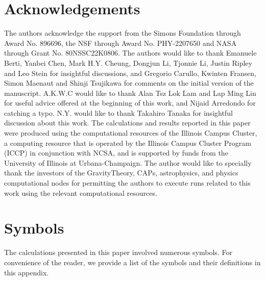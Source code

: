 \documentclass[aps,prx,amsmath,floats,floatfix,twocolumn,
  superscriptaddress,nofootinbib,showpacs]{revtex4-1}
\begin{document}
\section*{Acknowledgements}

The authors acknowledge the support from the Simons Foundation through Award No. 896696, the NSF through Award No. PHY-2207650 and NASA through Grant No. 80NSSC22K0806. 
The authors would like to thank Emanuele Berti, Yanbei Chen, Mark H.Y. Cheung, Dongjun Li, Tjonnie Li, Justin Ripley and Leo Stein for insightful discussions, and Gregorio Carullo, Kwinten Fransen, Simon Maenaut and Shinji Tsujikawa for comments on the initial version of the manuscript.
A.K.W.C would like to thank Alan Tsz Lok Lam and Lap Ming Lin for useful advice offered at the beginning of this work, and Nijaid Arredondo for catching a typo. 
N.Y. would like to thank Takahiro Tanaka for insightful discussion about this work. 
The calculations and results reported in this paper were produced using the computational resources of the Illinois Campus Cluster, a computing resource that is operated by the Illinois Campus Cluster Program (ICCP) in conjunction with NCSA, and is supported by funds from the University of Illinois at Urbana-Champaign. 
The author would like to specially thank the investors of the GravityTheory, CAPs, astrophysics, and physics computational nodes for permitting the authors to execute runs related to this work using the relevant computational resources. 

\appendix

\section{Symbols}
\label{sec:Appendix_A}

The calculations presented in this paper involved numerous symbols. 
For convenience of the reader, we provide a list of the symbols and their definitions in this appendix. 
\end{document}
